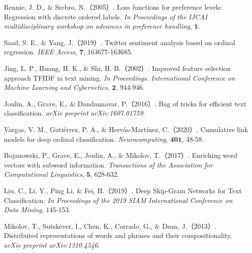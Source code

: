 \noindent Rennie, J. D., $\&$ Srebro, N.（2005）. Loss functions for preference levels: Regression with discrete ordered labels. \textit{In Proceedings of the IJCAI multidisciplinary workshop on advances in preference handling}, $\bm{1}$.

\noindent Saad, S. E., $\&$ Yang, J.（2019）. Twitter sentiment analysis based on ordinal regression. \textit{IEEE Access}, $\bm{7}$, 163677-163685.

\noindent Jing, L. P., Huang, H. K., $\&$ Shi, H. B.（2002）. Improved feature selection approach TFIDF in text mining. \textit{In Proceedings. International Conference on Machine Learning and Cybernetics, $\bm{2}$}, 944-946.

\noindent Joulin, A., Grave, E., $\&$ Dandannavar, P.（2016）. Bag of tricks for efficient text classification. \textit{arXiv preprint arXiv:1607.01759}.

\noindent Vargas, V. M., Gutiérrez, P. A., $\&$  Hervás-Martínez, C.（2020）. Cumulative link models for deep ordinal classification. \textit{Neurocomputing, }$\bm{401}$, 48-58.

\noindent Bojanowski, P., Grave, E., Joulin, A., $\&$ Mikolov, T.（2017）. Enriching word vectors with subword information. \textit{Transactions of the Association for Computational Linguistics}, $\bm{5}$, 628-632.

\noindent Liu, C., Li, Y., Ping Li, $\&$  Fei, H.（2019）. Deep Skip-Gram Networks for Text Classification. \textit{In Proceedings of the 2019 SIAM International Conference on Data Mining}, 145-153.

\noindent Mikolov, T., Sutskever, I., Chen, K., Corrado, G., $\&$ Dean, J.（2013）. Distributed representations of words and phrases and their compositionality. \textit{arXiv preprint arXiv:1310.4546}.





\newpage
\thispagestyle{empty}


%
